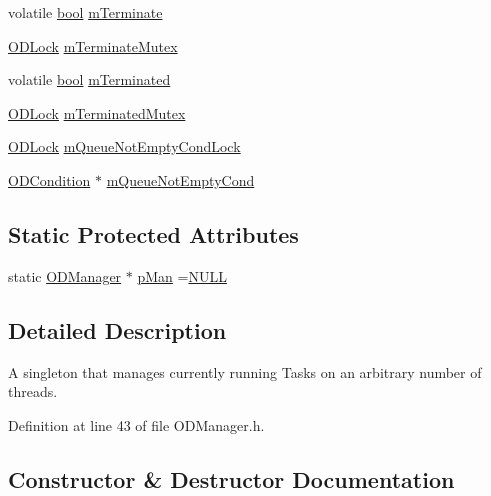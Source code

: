 \begin{DoxyCompactItemize}
volatile \hyperlink{mac_2config_2i386_2lib-src_2libsoxr_2soxr-config_8h_abb452686968e48b67397da5f97445f5b}{bool} \hyperlink{class_o_d_manager_affc1004f5826b83f3bfd258f59b31f02}{m\+Terminate}
\item 
\hyperlink{class_o_d_lock}{O\+D\+Lock} \hyperlink{class_o_d_manager_a7690b70eb196abd7e7953e552735f501}{m\+Terminate\+Mutex}
\item 
volatile \hyperlink{mac_2config_2i386_2lib-src_2libsoxr_2soxr-config_8h_abb452686968e48b67397da5f97445f5b}{bool} \hyperlink{class_o_d_manager_af90ef020c68adcd0c9f9e0b7bcf799bb}{m\+Terminated}
\item 
\hyperlink{class_o_d_lock}{O\+D\+Lock} \hyperlink{class_o_d_manager_ad85b08f29c24368568b063a6822eebd2}{m\+Terminated\+Mutex}
\item 
\hyperlink{class_o_d_lock}{O\+D\+Lock} \hyperlink{class_o_d_manager_a85a3669d8bba22645b47ff06b4164ac4}{m\+Queue\+Not\+Empty\+Cond\+Lock}
\item 
\hyperlink{class_o_d_condition}{O\+D\+Condition} $\ast$ \hyperlink{class_o_d_manager_aba42a99deec038f307a29971320f8416}{m\+Queue\+Not\+Empty\+Cond}
\end{DoxyCompactItemize}
\subsection*{Static Protected Attributes}
\begin{DoxyCompactItemize}
\item 
static \hyperlink{class_o_d_manager}{O\+D\+Manager} $\ast$ \hyperlink{class_o_d_manager_a35f30c3429c263f3d2d05206942bd036}{p\+Man} =\hyperlink{px__mixer_8h_a070d2ce7b6bb7e5c05602aa8c308d0c4}{N\+U\+LL}
\end{DoxyCompactItemize}


\subsection{Detailed Description}
A singleton that manages currently running Tasks on an arbitrary number of threads. 

Definition at line 43 of file O\+D\+Manager.\+h.



\subsection{Constructor \& Destructor Documentation}
